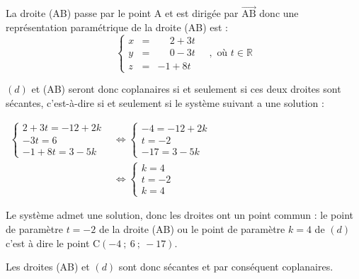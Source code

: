 \documentclass[10pt]{article}
\providecommand{\R}{\mathbb{R}}
\providecommand{\vect}[1]{\overrightarrow{#1}}
\begin{document}
La droite (AB) passe par le point A et  est dirigée par $\vect{\mathrm{AB}}$ donc une représentation paramétrique de la droite (AB) est :
\[\left\{\begin{array}{lcl}
x&=&\phantom{-}2 +3t\\
y&=&\phantom{-}0 -3 t\\
z&=&-1+8t
\end{array} \quad, \text { où } t \in \R\right.\]

$(d)$ et (AB) seront donc coplanaires si et seulement si ces deux droites sont sécantes, c'est-à-dire si et seulement si le système suivant a une solution :

$\begin{aligned}
	\left\{\begin{array}{l}
		2+3t=-12+2k\\
		-3t=6 \\
		-1+8t=3-5k
	\end{array}\right.
	&\iff
	\left\{\begin{array}{l}
		-4=-12+2k \\
		t=-2\\
		-17=3-5k
	\end{array}\right.\\
	&\iff
	\left\{\begin{array}{l}
		k=4 \\
		t=-2\\
		k=4
	\end{array}\right.
\end{aligned}$

Le système admet une solution, donc les droites ont un point commun : le point de paramètre $t=-2$ de la droite (AB) ou le point de paramètre $k=4$ de $(d)$ c'est à dire le point C$(-4~;~6~;~-17)$.

Les droites (AB) et $(d)$  sont donc sécantes et par conséquent coplanaires.

\bigskip
\end{document}
